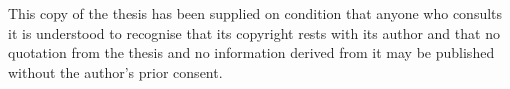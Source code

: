 This copy of the thesis has been supplied on condition that anyone who consults it is understood to recognise that its copyright rests with its author and that no quotation from the thesis and no information derived from it may be published without the author's prior consent.
